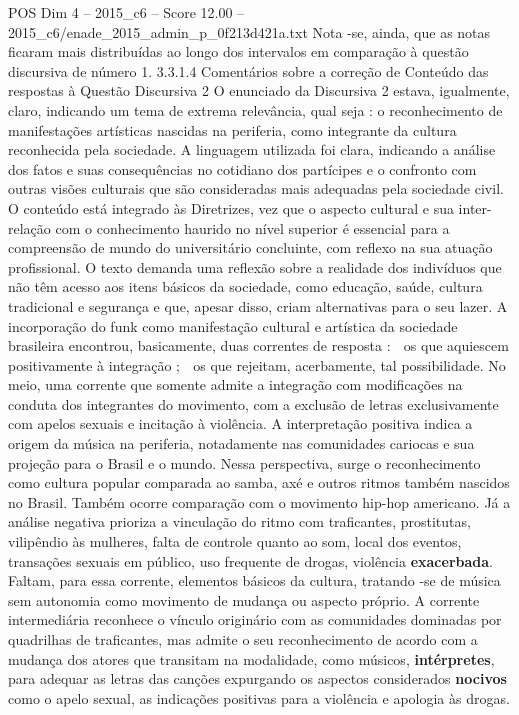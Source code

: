 \begin{textsample}{POS Dim 4 – 2015\_c6 – Score 12.00 – 2015\_c6/enade\_2015\_admin\_p\_0f213d421a.txt}
Nota -se, ainda, que as notas ficaram mais distribuídas ao longo dos intervalos em comparação à questão discursiva de número 1. 3.3.1.4 Comentários sobre a correção de Conteúdo das respostas à Questão Discursiva 2 O enunciado da Discursiva 2 estava, igualmente, claro, indicando um tema de extrema relevância, qual seja : o reconhecimento de manifestações artísticas nascidas na periferia, como integrante da cultura reconhecida pela sociedade.
A linguagem utilizada foi clara, indicando a análise dos fatos e suas consequências no cotidiano dos partícipes e o confronto com outras visões culturais que são consideradas mais adequadas pela sociedade civil.
O conteúdo está integrado às Diretrizes, vez que o aspecto cultural e sua inter-relação com o conhecimento haurido no nível superior é essencial para a compreensão de mundo do universitário concluinte, com reflexo na sua atuação profissional.
O texto demanda uma reflexão sobre a realidade dos indivíduos que não têm acesso aos itens básicos da sociedade, como educação, saúde, cultura tradicional e segurança e que, apesar disso, criam alternativas para o seu lazer.
A incorporação do funk como manifestação cultural e artística da sociedade brasileira encontrou, basicamente, duas correntes de resposta :  os que aquiescem positivamente à integração ;  os que rejeitam, acerbamente, tal possibilidade.
No meio, uma corrente que somente admite a integração com modificações na conduta dos integrantes do movimento, com a exclusão de letras exclusivamente com apelos sexuais e incitação à violência.
A interpretação positiva indica a origem da música na periferia, notadamente nas comunidades cariocas e sua projeção para o Brasil e o mundo.
Nessa perspectiva, surge o reconhecimento como cultura popular comparada ao samba, axé e outros ritmos também nascidos no Brasil.
Também ocorre comparação com o movimento hip-hop americano.
Já a análise negativa prioriza a vinculação do ritmo com traficantes, prostitutas, vilipêndio às mulheres, falta de controle quanto ao som, local dos eventos, transações sexuais em público, uso frequente de drogas, violência \textbf{exacerbada}.
Faltam, para essa corrente, elementos básicos da cultura, tratando -se de música sem autonomia como movimento de mudança ou aspecto próprio.
A corrente intermediária reconhece o vínculo originário com as comunidades dominadas por quadrilhas de traficantes, mas admite o seu reconhecimento de acordo com a mudança dos atores que transitam na modalidade, como músicos, \textbf{intérpretes}, para adequar as letras das canções expurgando os aspectos considerados \textbf{nocivos} como o apelo sexual, as indicações positivas para a violência e apologia às drogas.

\end{textsample}
